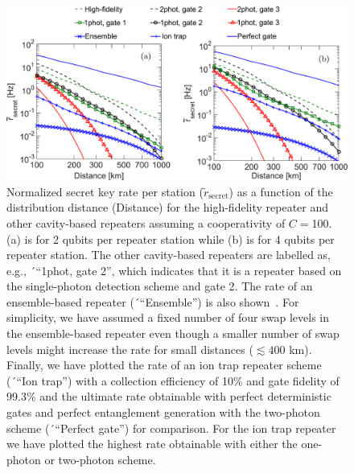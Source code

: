 \begin{figure} [H]
\centering
\includegraphics[width=1\textwidth]{./figs_Borregaard_PRA2015/figureX7}
\caption[Optimal secret key rate I]    
{Normalized secret key rate per station
($\tilde{r}_{\mathrm{secret}}$) as a function of the distribution distance
(Distance) for the high-fidelity repeater and other cavity-based repeaters
assuming a cooperativity of $C=$100. (a) is for 2 qubits per repeater station
while (b) is for 4 qubits per repeater station. The other cavity-based repeaters
are labelled as, e.g., ´``1phot, gate 2'', which indicates that it is a
repeater based on the single-photon detection scheme and gate 2. The rate of an
ensemble-based repeater (´``Ensemble'') is also shown~\cite{sangouard1}. For
simplicity, we have assumed a fixed number of four swap levels in the
ensemble-based repeater even though a smaller number of swap levels might
increase the rate for small distances ($\lesssim400$ km). Finally, we have
plotted the rate of an ion trap repeater scheme (´``Ion trap'') with a
collection efficiency of 10\% and gate fidelity of 99.3\% and the ultimate rate
obtainable with perfect deterministic gates and perfect entanglement generation
with the two-photon scheme (´``Perfect gate'') for comparison. For the ion trap
repeater we have plotted the highest rate obtainable with either the one-photon
or two-photon scheme.}
\label{fig:figureX7}
\end{figure} 
